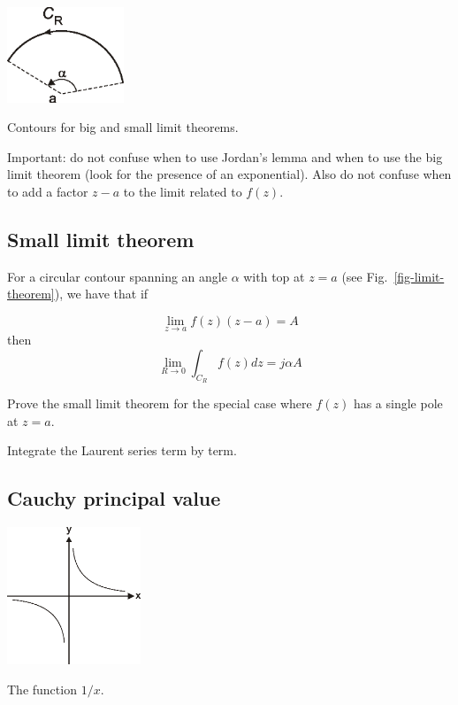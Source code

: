 \begin{marginfigure}
\centering
\includegraphics[width=3.5cm]{complex/figures/limit_theorem}
\caption{Contours for big and small limit theorems.}
\label{fig-limit-theorem}
\end{marginfigure}

Important: do not confuse when to use Jordan's lemma and when to use the big limit theorem (look for the presence of an exponential). Also do not confuse when to add a factor $z-a$ to the limit related to $f(z)$.

\subsection*{Small limit theorem} 

For a circular contour spanning an angle $\alpha$ with top at $z=a$ (see Fig.~\ref{fig-limit-theorem}), we have that if

\begin{equation}
\lim_{z \to a}  f(z) (z-a) = A
\end{equation}
then
\begin{equation}
\lim_{R \to 0} \int_{{C}_R} f(z) dz = j \alpha A
\end{equation}

\begin{exer}
  Prove the small limit theorem for the special case where $f(z)$ has a single pole at $z=a$.
  \begin{hnt}
    Integrate the Laurent series term by term.
  \end{hnt}
\end{exer}

\subsection*{Cauchy principal value}

\begin{marginfigure}
\centering
\includegraphics[width=4cm]{complex/figures/pv}
\caption{The function $1/x$.}
\label{fig-pv}
\end{marginfigure}

